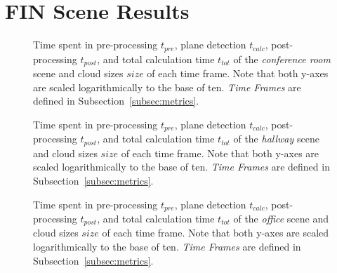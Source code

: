\documentclass[main.tex]{subfiles}
\begin{document}
\appendix
\chapter{FIN Scene Results}
\setcounter{page}{71}
\label{app:fin}

\begin{figure}[H]
    \centering
    \def\svgwidth{0.7\textwidth}
    
    \caption[Time Results Conference Room Scene]{Time spent in pre-processing $t_{pre}$, plane detection $t_{calc}$, post-processing
        $t_{post}$, and total calculation time $t_{tot}$ of the \textit{conference room} scene and cloud sizes $size$ of each time frame.
        Note that both y-axes are scaled logarithmically to the base of ten. \textit{Time Frames} are defined in Subsection~\ref{subsec:metrics}.}
    \label{fig:dynconf}
\end{figure}

\begin{figure}[H]
    \centering
    \def\svgwidth{0.7\textwidth}
    
    \caption[Time Results Hallway Scene]{Time spent in pre-processing $t_{pre}$, plane detection $t_{calc}$, post-processing
        $t_{post}$, and total calculation time $t_{tot}$ of the \textit{hallway} scene and cloud sizes $size$ of each time frame.
        Note that both y-axes are scaled logarithmically to the base of ten. \textit{Time Frames} are defined in Subsection~\ref{subsec:metrics}.}
    \label{fig:dynhallway}
\end{figure}

\begin{figure}[p]
    \centering
    \def\svgwidth{0.7\textwidth}
    
    \caption[Time Results Office Scene]{Time spent in pre-processing $t_{pre}$, plane detection $t_{calc}$, post-processing
        $t_{post}$, and total calculation time $t_{tot}$ of the \textit{office} scene and cloud sizes $size$ of each time frame.
        Note that both y-axes are scaled logarithmically to the base of ten. \textit{Time Frames} are defined in Subsection~\ref{subsec:metrics}.}
    \label{fig:dynoff}
\end{figure}
\end{document}
